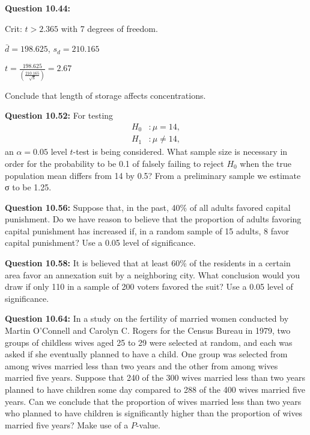 \documentclass{article}
\begin{document}
\textbf{Question 10.44:}
\begin{description}
    \item Crit: $t>2.365$ with 7 degrees of freedom.
    \item $\bar{d}=198.625$, $s_d=210.165$
    \item $t=\frac{198.625}{(\frac{210.165}{\sqrt{8}})}=2.67$
    \item Conclude that length of storage affects concentrations.
\end{description}


\textbf{Question 10.52:}
For testing
\begin{align*}
    H_0 &: \mu = 14,\\
    H_1 &: \mu \not= 14,
\end{align*}
an $\alpha = 0.05$ level $t$-test is being considered. What 
sample size is necessary in order for the probability to be
0.1 of falsely failing to reject $H_0$ when the true 
population mean differs from 14 by 0.5? From a preliminary
sample we estimate σ to be 1.25.
\newline

\textbf{Question 10.56:}
Suppose that, in the past, 40\% of all adults
favored capital punishment. Do we have reason to
believe that the proportion of adults favoring capital
punishment has increased if, in a random sample of 15
adults, 8 favor capital punishment? Use a 0.05 level of
significance.
\newline

\textbf{Question 10.58:}
It is believed that at least 60\% of the residents
in a certain area favor an annexation suit by a 
neighboring city. What conclusion would you draw if only
110 in a sample of 200 voters favored the suit? Use a
0.05 level of significance.
\newline

\textbf{Question 10.64:}
In a study on the fertility of married women
conducted by Martin O’Connell and Carolyn C. Rogers
for the Census Bureau in 1979, two groups of childless
wives aged 25 to 29 were selected at random, and each
was asked if she eventually planned to have a child.
One group was selected from among wives married
less than two years and the other from among wives
married five years. Suppose that 240 of the 300 wives
married less than two years planned to have children
some day compared to 288 of the 400 wives married
five years. Can we conclude that the proportion of
wives married less than two years who planned to have
children is significantly higher than the proportion of
wives married five years? Make use of a $P$-value.
\newline
\end{document}

